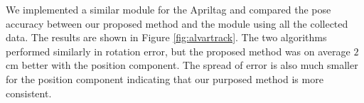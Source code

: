 We implemented a similar module for the Apriltag and compared the pose accuracy between our proposed method and the module using all the collected data. The results are shown in Figure \ref{fig:alvartrack}. The two algorithms performed similarly in rotation error, but the proposed method was on average $2$ cm better with the position component. The spread of error is also much smaller for the position component indicating that our purposed method is more consistent.
\begin{figure}
\centering
{}
\hfil
{}

\end{figure}
